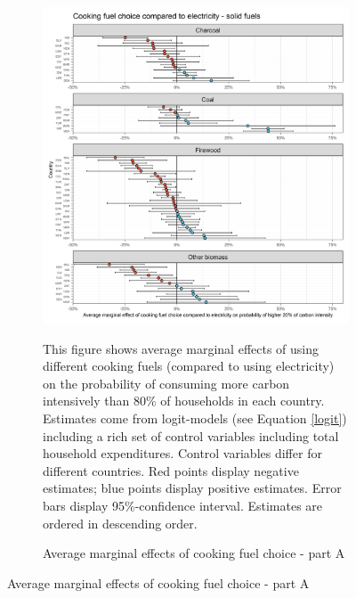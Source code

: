  \begin{figure}[ht!]\ContinuedFloat
   \centering
   \begin{subfigure}[b]{\textwidth}
   \centering
   \caption{Average marginal effects of cooking fuel choice - part A} \label{fig:Logit_ME_CF_1}
   \includegraphics{1_Figures/Analysis_Logit_Models_Marginal_Effects/Average_Marginal_Effects_affected_upper_80_CF_Electricity A_2017.jpg}
   \begin{subcaption2}
     This figure shows average marginal effects of using different cooking fuels (compared to using electricity) on the probability of consuming more carbon intensively than 80\% of households in each country. Estimates come from logit-models (see Equation \ref{logit}) including a rich set of control variables including total household expenditures. Control variables differ for different countries. Red points display negative estimates; blue points display positive estimates. Error bars display 95\%-confidence interval. Estimates are ordered in descending order.
   \end{subcaption2}
   \end{subfigure}
 \end{figure}
 \clearpage

